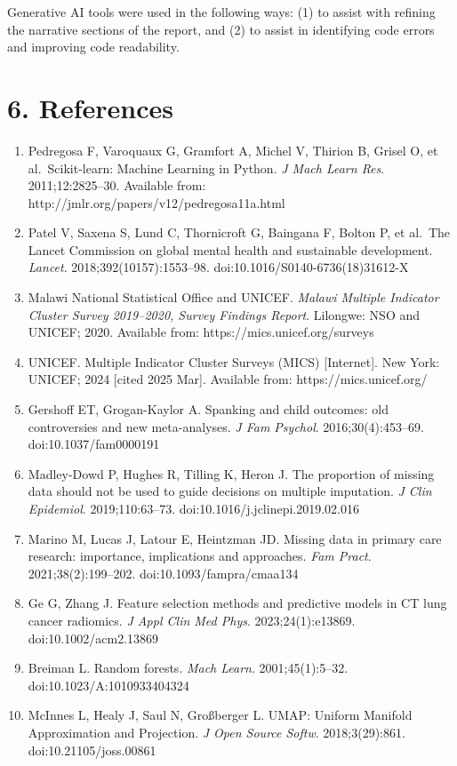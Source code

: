 \documentclass[11pt]{article}
\begin{document}
Generative AI tools were used in the following ways: (1) to assist with
refining the narrative sections of the report, and (2) to assist in
identifying code errors and improving code readability.

    \hypertarget{references}{%
\section{6. References}\label{references}}

\begin{enumerate}
\def\labelenumi{\arabic{enumi}.}
\item
  Pedregosa F, Varoquaux G, Gramfort A, Michel V, Thirion B, Grisel O,
  et al.~Scikit-learn: Machine Learning in Python. \emph{J Mach Learn
  Res}. 2011;12:2825--30. Available from:
  http://jmlr.org/papers/v12/pedregosa11a.html
\item
  Patel V, Saxena S, Lund C, Thornicroft G, Baingana F, Bolton P, et
  al.~The Lancet Commission on global mental health and sustainable
  development. \emph{Lancet}. 2018;392(10157):1553--98.
  doi:10.1016/S0140-6736(18)31612-X
\item
  Malawi National Statistical Office and UNICEF. \emph{Malawi Multiple
  Indicator Cluster Survey 2019--2020, Survey Findings Report}.
  Lilongwe: NSO and UNICEF; 2020. Available from:
  https://mics.unicef.org/surveys
\item
  UNICEF. Multiple Indicator Cluster Surveys (MICS) {[}Internet{]}. New
  York: UNICEF; 2024 {[}cited 2025 Mar{]}. Available from:
  https://mics.unicef.org/
\item
  Gershoff ET, Grogan-Kaylor A. Spanking and child outcomes: old
  controversies and new meta-analyses. \emph{J Fam Psychol}.
  2016;30(4):453--69. doi:10.1037/fam0000191
\item
  Madley-Dowd P, Hughes R, Tilling K, Heron J. The proportion of missing
  data should not be used to guide decisions on multiple imputation.
  \emph{J Clin Epidemiol}. 2019;110:63--73.
  doi:10.1016/j.jclinepi.2019.02.016
\item
  Marino M, Lucas J, Latour E, Heintzman JD. Missing data in primary
  care research: importance, implications and approaches. \emph{Fam
  Pract}. 2021;38(2):199--202. doi:10.1093/fampra/cmaa134
\item
  Ge G, Zhang J. Feature selection methods and predictive models in CT
  lung cancer radiomics. \emph{J Appl Clin Med Phys}. 2023;24(1):e13869.
  doi:10.1002/acm2.13869
\item
  Breiman L. Random forests. \emph{Mach Learn}. 2001;45(1):5--32.
  doi:10.1023/A:1010933404324
\item
  McInnes L, Healy J, Saul N, Großberger L. UMAP: Uniform Manifold
  Approximation and Projection. \emph{J Open Source Softw}.
  2018;3(29):861. doi:10.21105/joss.00861
\end{enumerate}
\end{document}
